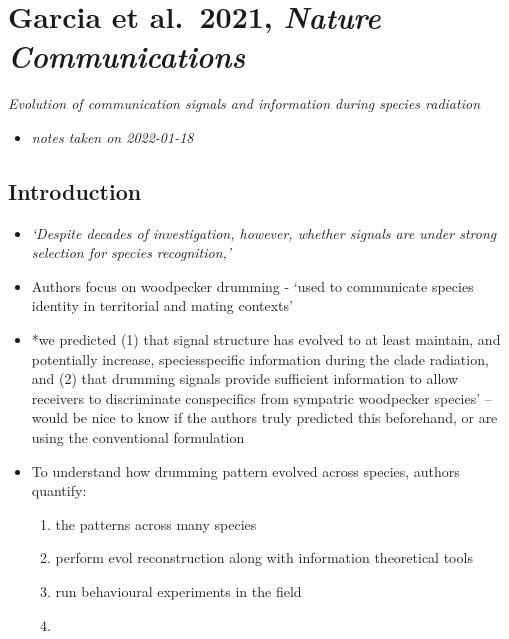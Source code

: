 \documentclass[
]{book}
\providecommand{\tightlist}{%
  \setlength{\itemsep}{0pt}\setlength{\parskip}{0pt}}
\begin{document}
\hypertarget{garcia-et-al.-2021-nature-communications}{%
\chapter{\texorpdfstring{Garcia et al.~2021, \emph{Nature Communications}}{Garcia et al.~2021, Nature Communications}}\label{garcia-et-al.-2021-nature-communications}}


\emph{Evolution of communication signals and information during species radiation} \citep{garcia2020evolution}

\begin{itemize}
\tightlist
\item
  \emph{notes taken on 2022-01-18}
\end{itemize}

\hypertarget{introduction-17}{%
\section{Introduction}\label{introduction-17}}

\begin{itemize}
\item
  \emph{`Despite decades of investigation, however, whether signals are under strong selection for species recognition,'}
\item
  Authors focus on woodpecker drumming - `used to communicate species identity in territorial and mating contexts'
\item
  *we predicted (1) that signal structure has
  evolved to at least maintain, and potentially increase, speciesspecific information during the clade radiation, and (2) that drumming signals provide sufficient information to allow receivers to discriminate conspecifics from sympatric woodpecker species' -- would be nice to know if the authors truly predicted this beforehand, or are using the conventional formulation
\item
  To understand how drumming pattern evolved across species, authors quantify:

  \begin{enumerate}
  \def\labelenumi{\arabic{enumi}.}
  \tightlist
  \item
    the patterns across many species
  \item
    perform evol reconstruction along with information theoretical tools
  \item
    run behavioural experiments in the field
  \item
  \end{enumerate}
\end{itemize}
\end{document}
